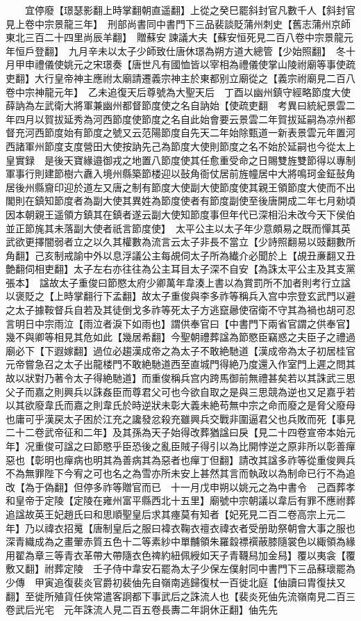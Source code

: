 　　宜停廢【璟瑟影翻上時掌翻朝直遥翻】上從之癸巳罷斜封官凡數千人【斜封官見上卷中宗景龍三年】　刑部尚書同中書門下三品裴談貶蒲州刺史【舊志蒲州京師東北三百二十四里尚辰羊翻】　贈蘇安諫議大夫【蘇安恒死見二百八卷中宗景龍元年恒戶登翻】　九月辛未以太子少師致仕唐休璟為朔方道大總管【少始照翻】　冬十月甲申禮儀使姚元之宋璟奏【唐世凡有國恤皆以宰相為禮儀使掌山陵祔廟等事使疏吏翻】大行皇帝神主應祔太廟請遷義宗神主於東都别立廟從之【義宗祔廟見二百八卷中宗神龍元年】　乙未追復天后尊號為大聖天后　丁酉以幽州鎮守經略節度大使薛訥為左武衛大將軍兼幽州都督節度使之名自訥始【使疏吏翻　考異曰統紀景雲二年四月以賀拔延秀為河西節度使節度之名自此始會要云景雲二年賀拔延嗣為凉州都督充河西節度始有節度之號又云范陽節度自先天二年始除甄道一新表景雲元年置河西諸軍州節度支度營田大使按訥先己為節度大使則節度之名不始於延嗣也今從太上皇實録　是後天寶緣邉御戎之地置八節度使其任愈重受命之日賜雙旌雙節得以專制軍事行則建節樹六纛入境州縣築節楼迎以鼔角衙仗居前旌幢居中大將鳴珂金鉦鼔角居後州縣齎印迎於道左又唐之制有節度大使副大使節度使其親王領節度大使而不出閣則在鎮知節度者為副大使其異姓為節度使者有節度副使至後唐開成二年七月勑頃因本朝親王遥領方鎮其在鎮者遂云副大使知節度事但年代已深相沿未改今天下侯伯並正節旄其未落副大使者祇言節度使】　太平公主以太子年少意頗易之既而憚其英武欲更擇闇弱者立之以久其權數為流言云太子非長不當立【少詩照翻易以豉翻數所角翻】己亥制戒諭中外以息浮議公主每覘伺太子所為纎介必聞於上【覘丑亷翻又丑艶翻伺相吏翻】太子左右亦往往為公主耳目太子深不自安【為誅太平公主及其支黨張本】　諡故太子重俊曰節愍太府少卿萬年韋湊上書以為賞罰所不加者則考行立諡以褒貶之【上時掌翻行下孟翻】故太子重俊與李多祚等稱兵入宫中宗登玄武門以避之太子據鞍督兵自若及其徒倒戈多祚等死太子方逃竄曏使宿衛不守其為禍也胡可忍言明日中宗雨泣【雨泣者淚下如雨也】謂供奉官曰【中書門下兩省官謂之供奉官】幾不與卿等相見其危如此【幾居希翻】今聖朝禮葬諡為節愍臣竊惑之夫臣子之禮過廟必下【下遐嫁翻】過位必趨漢成帝之為太子不敢絶馳道【漢成帝為太子初居桂官元帝嘗急召之太子出龍楼門不敢絶馳道西至直城門得絶乃度還入作室門上遲之問其故以狀對乃著令太子得絶馳道】而重俊稱兵宫内跨馬御前無禮甚矣若以其誅武三思父子而嘉之則興兵以誅姦臣而尊君父可也今欲自取之是與三思競為逆也又足嘉乎若以其欲廢韋氏而嘉之則韋氏於時逆狀未彰大義未絶苟無中宗之命而廢之是脅父廢母也庸可乎漢戻太子困於江充之讒發忿殺充雖興兵交戰非圍逼君父也兵敗而死【事見二十二卷武帝征和二年】及其孫為天子始得改葬猶諡曰戾【見二十四卷宣帝本始元年】况重俊可諡之曰節愍乎臣恐後之亂臣賊子得引以為比開悖逆之原非所以彰善癉惡也【彰明也癉病也明其為善病其為惡者也癉丁但翻】請改其諡多祚等從重俊興兵不為無罪陛下今宥之可也名之為雪亦所未安上甚然其言而執政以為制命已行不為追改【為于偽翻】但停多祚等贈官而已　十一月戊申朔以姚元之為中書令　己酉葬孝和皇帝于定陵【定陵在雍州富平縣西北十五里】廟號中宗朝議以韋后有罪不應祔葬追諡故英王妃趙氏曰和思順聖皇后求其瘞莫有知者【妃死見二百二卷高宗上元二年】乃以禕衣招䰟【唐制皇后之服曰褘衣鞠衣䄠衣禕衣者受册助祭朝會大事之服也深青織成為之畫翬赤質五色十二等素紗中單黼領朱羅縠褾襈蔽膝隨裳色以緅領為緣用翟為章三等青衣革帶大帶隨衣色禆約紐佩綬如天子青韈舄加金舄】覆以夷衾【覆敷又翻】祔葬定陵　壬子侍中韋安石罷為太子少保左僕射同中書門下三品蘇瓌罷為少傳　甲寅追復裴炎官爵初裴伷先自嶺南逃歸復杖一百徙北庭【伷讀曰胄復扶又翻】至徙所殖貨任俠常遣客詗都下事武后之誅流人也【裴炎死伷先流嶺南見二百三卷武后光宅　元年誅流人見二百五卷長夀二年詗休正翻】伷先先